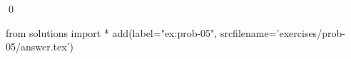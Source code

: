 
\begin{ex} 
  \label{ex:prob-05}
  
  \qed
\end{ex} 
\begin{python0}
from solutions import *
add(label="ex:prob-05",
    srcfilename='exercises/prob-05/answer.tex') 
\end{python0}

